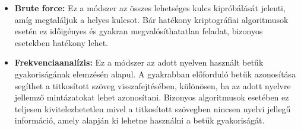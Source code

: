 \begin{itemize}
	\item\textbf{Brute force:} Ez a módszer az összes lehetséges kulcs kipróbálását jelenti, amíg megtaláljuk a helyes kulcsot. Bár hatékony kriptográfiai algoritmusok esetén ez időigényes és gyakran megvalósíthatatlan feladat, bizonyos esetekben hatékony lehet.

	\item\textbf{Frekvenciaanalízis:} Ez a módszer az adott nyelven használt betűk gyakoriságának elemzésén alapul. A gyakrabban előforduló betűk azonosítása segíthet a titkosított szöveg visszafejtésében, különösen, ha az adott nyelvre jellemző mintázatokat lehet azonosítani. Bizonyos algoritmusok esetében ez teljesen kivitelezhetetlen mivel a titkosított szövegben nincsen nyelvi jellegű információ, amely alapján ki lehetne használni a betűk gyakoriságát.
\end{itemize}



































